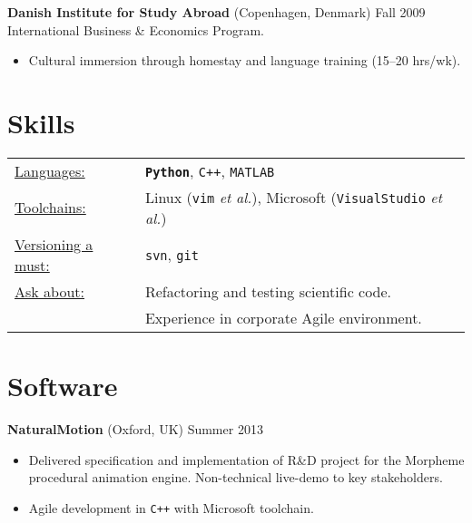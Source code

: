 \documentclass[margin]{res}
\newcommand{\locdatesubsection}[3]{\textbf{#1} (#2) \hfill #3}
\begin{document}
\begin{sloppypar}
\begin{resume}
\locdatesubsection{Danish Institute for Study Abroad}{Copenhagen, Denmark}{Fall 2009}\\
International Business \& Economics Program.
\begin{itemize}
    \item Cultural immersion through homestay and language training (15--20 hrs/wk). 
\end{itemize}

\section{Skills}
\begin{tabular}{l p{3in}}
    \underline{Languages:} & \textbf{\texttt{Python}}, \texttt{C++}, \textsc{\texttt{MATLAB}} \\
    \underline{Toolchains:} & Linux (\texttt{vim} \textit{et al.}), Microsoft (\texttt{VisualStudio} \textit{et al.}) \\
    \underline{Versioning a must:} & \texttt{svn}, \texttt{git} \\
    \underline{Ask about:} & Refactoring and testing scientific code. \\
                           & Experience in corporate Agile environment.
\end{tabular}

\section{Software}
\locdatesubsection{NaturalMotion}{Oxford, UK}{Summer 2013}
\begin{itemize}
\item Delivered specification and implementation of R\&D project for the Morpheme procedural animation engine. Non-technical live-demo to key stakeholders.
\item Agile development in \texttt{C++} with Microsoft toolchain.
\end{itemize}


\end{resume}
\end{sloppypar}
\end{document}
